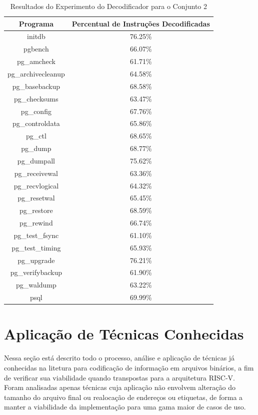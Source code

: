 \begin{table}[!h]
    \centering
    
    \begin{tabular}{|c|c|}
        \hline
        Programa & Percentual de Instruções Decodificadas \\
        \hline
        initdb & 76.25\% \\
        \hline
        pgbench & 66.07\% \\
        \hline
        pg\_amcheck & 61.71\% \\
        \hline
        pg\_archivecleanup & 64.58\% \\
        \hline
        pg\_basebackup & 68.58\% \\
        \hline
        pg\_checksums & 63.47\% \\
        \hline
        pg\_config & 67.76\% \\
        \hline
        pg\_controldata & 65.86\% \\
        \hline
        pg\_ctl & 68.65\% \\
        \hline
        pg\_dump & 68.77\% \\
        \hline
        pg\_dumpall & 75.62\% \\
        \hline
        pg\_receivewal & 63.36\% \\
        \hline
        pg\_recvlogical & 64.32\% \\
        \hline
        pg\_resetwal & 65.45\% \\
        \hline
        pg\_restore & 68.59\% \\
        \hline
        pg\_rewind & 66.74\% \\
        \hline
        pg\_test\_fsync & 61.10\% \\
        \hline
        pg\_test\_timing & 65.93\% \\
        \hline
        pg\_upgrade & 76.21\% \\
        \hline
        pg\_verifybackup & 61.90\% \\
        \hline
        pg\_waldump & 63.22\% \\
        \hline
        psql & 69.99\% \\
        \hline
    \end{tabular}
    \caption{Resultados do Experimento do Decodificador para o Conjunto 2}
    \label{tab:exp1_2}
\end{table}

\section{Aplicação de Técnicas Conhecidas}
Nessa seção está descrito todo o processo, análise e aplicação de técnicas já conhecidas na litetura para codificação de informação em arquivos binários, a fim de verificar sua viabilidade quando transpostas para a arquitetura RISC-V. Foram analisadas apenas técnicas cuja aplicação não envolvem alteração do tamanho do arquivo final ou realocação de endereços ou etiquetas, de forma a manter a viabilidade da implementação para uma gama maior de casos de uso.


